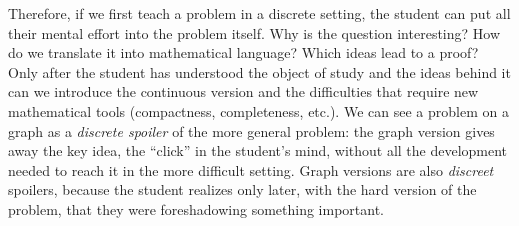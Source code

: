 \documentclass[11pt,a4paper]{article}
\theoremstyle{plain}
\theoremstyle{definition}
\begin{document}
Therefore, if we first teach a problem in a discrete setting, the student can put all their mental effort into the problem itself. Why is the question interesting? How do we translate it into mathematical language? Which ideas lead to a proof? Only after the student has understood the object of study and the ideas behind it can we introduce the continuous version and the difficulties that require new mathematical tools (compactness, completeness, etc.). We can see a problem on a graph as a \emph{discrete spoiler} of the more general problem: the graph version gives away the key idea, the ``click'' in the student's mind, without all the development needed to reach it in the more difficult setting. Graph versions are also \emph{discreet} spoilers, because the student realizes only later, with the hard version of the problem, that they were foreshadowing something important.
\end{document}
